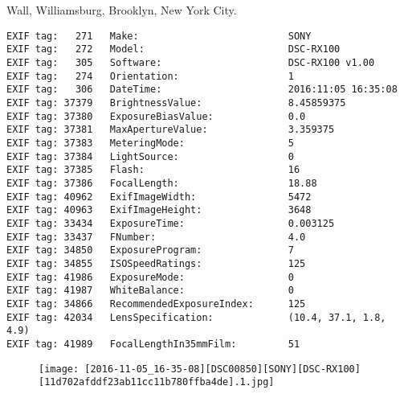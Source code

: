 \section{\protect{}}
\noindent Wall, Williamsburg, Brooklyn, New York City.
\noindent
\begin{lstlisting}
EXIF tag:   271   Make:                          SONY
EXIF tag:   272   Model:                         DSC-RX100
EXIF tag:   305   Software:                      DSC-RX100 v1.00
EXIF tag:   274   Orientation:                   1
EXIF tag:   306   DateTime:                      2016:11:05 16:35:08
EXIF tag: 37379   BrightnessValue:               8.45859375
EXIF tag: 37380   ExposureBiasValue:             0.0
EXIF tag: 37381   MaxApertureValue:              3.359375
EXIF tag: 37383   MeteringMode:                  5
EXIF tag: 37384   LightSource:                   0
EXIF tag: 37385   Flash:                         16
EXIF tag: 37386   FocalLength:                   18.88
EXIF tag: 40962   ExifImageWidth:                5472
EXIF tag: 40963   ExifImageHeight:               3648
EXIF tag: 33434   ExposureTime:                  0.003125
EXIF tag: 33437   FNumber:                       4.0
EXIF tag: 34850   ExposureProgram:               7
EXIF tag: 34855   ISOSpeedRatings:               125
EXIF tag: 41986   ExposureMode:                  0
EXIF tag: 41987   WhiteBalance:                  0
EXIF tag: 34866   RecommendedExposureIndex:      125
EXIF tag: 42034   LensSpecification:             (10.4, 37.1, 1.8, 4.9)
EXIF tag: 41989   FocalLengthIn35mmFilm:         51

\end{lstlisting}
\clearpage
\begin{figure}
\raggedleft
\texttt{[image: [2016-11-05\_16-35-08][DSC00850][SONY][DSC-RX100][11d702afddf23ab11cc11b780ffba4de].1.jpg]}
\end{figure}


\clearpage
